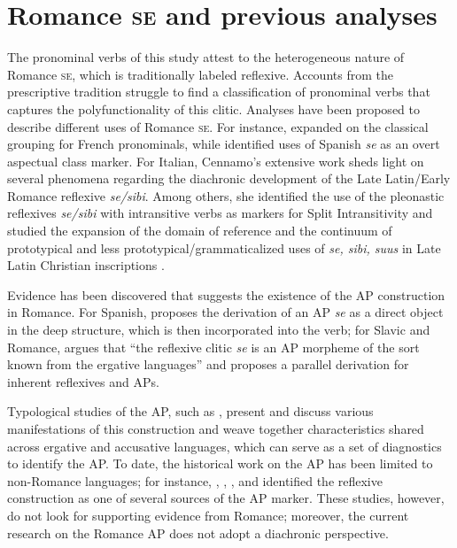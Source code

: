 \documentclass[output=paper,colorlinks,citecolor=brown]{langscibook}
\begin{document}
\section{Romance \textsc{se} and previous analyses} \label{Romance se}
The pronominal verbs of this study attest to the heterogeneous nature of Romance \textsc{se}, which is traditionally labeled reflexive. Accounts from the prescriptive tradition struggle to find a classification of pronominal verbs that captures the polyfunctionality of this clitic. Analyses have been proposed to describe different uses of Romance \textsc{se}.
For instance, \citet{melis_classement_1985, melis_voie_1990,melis_pronominal_1990} expanded on the classical grouping for French pronominals, while \citet{nishida_spanish_1994} identified uses of Spanish \textit{se} as an overt aspectual class marker. For Italian, Cennamo's extensive work sheds light on several phenomena regarding the diachronic development of the Late Latin/Early Romance reflexive \textit{se/sibi}. Among others, she identified the use of the pleonastic reflexives \textit{se/sibi} with intransitive verbs as markers for Split Intransitivity \citeyearpar{cennamo_late_1999} and studied the expansion of the domain of reference \citeyearpar{cennamo_lestensione_1993} and the continuum of prototypical and less prototypical/grammaticalized uses of \textit{se, sibi, suus} in Late Latin Christian inscriptions \citeyearpar{cennamo_se_1991}.

Evidence has been discovered that suggests the existence of the AP construction in Romance. For Spanish, \citet{masullo_antipassive_1992} proposes the derivation of an AP \textit{se} as a direct object in the deep structure, which is then incorporated into the verb; for Slavic and Romance, \citet[vii]{medova_reflexive_2009} argues that “the reflexive clitic \textit{se} is an AP morpheme of the sort known from the ergative languages” and proposes a parallel derivation for inherent reflexives and APs.

Typological studies of the AP, such as \citet{polinsky_13._2017}, present and discuss various manifestations of this construction and weave together characteristics shared across ergative and accusative languages, which can serve as a set of diagnostics to identify the AP. To date, the historical work on the AP has been limited to non-Romance languages; for instance,  \citet{terrill_development_1997},  \citet{creissels_origin_2012},  \citet{janic_slavonic_2013}, and \citet{sanso_where_2017, sanso_sources_2019} identified the reflexive construction as one of several sources of the AP marker. These studies, however, do not look for supporting evidence from Romance; moreover, the current research on the Romance AP does not adopt a diachronic perspective.
\end{document}
